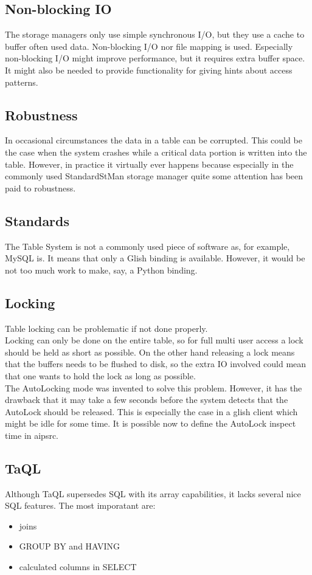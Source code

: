 \subsection{Non-blocking IO}
The storage managers only use simple synchronous I/O, but they use a
cache to buffer often used data.
Non-blocking I/O nor file mapping is used. Especially non-blocking I/O
might improve performance, but it requires extra buffer space.
It might also be needed to provide functionality for giving hints
about access patterns.

\subsection{Robustness}
In occasional circumstances the data in a table can be corrupted.
This could be the case when the system crashes while a critical data
portion is written into the table. However, in practice it
virtually ever happens because especially in the commonly used
StandardStMan storage manager quite some attention has been paid to
robustness.

\subsection{Standards}
The Table System is not a commonly used piece of software as, for
example, MySQL is. It means that only a Glish binding is available.
However, it would be not too much work to make, say, a Python binding.

\subsection{Locking}
Table locking can be problematic if not done properly.
\\Locking can only be done on the entire table, so for full multi user
access a lock should be held as short as possible. On the other hand
releasing a lock means that the buffers needs to be flushed to disk,
so the extra IO involved could mean that one wants to hold the lock
as long as possible.
\\The AutoLocking mode was invented to solve this problem. However,
it has the drawback that it may take a few seconds before the system
detects that the AutoLock should be released. This is especially the
case in a glish client which might be idle for some time. It is
possible now to define the AutoLock inspect time in aipsrc.

\subsection{TaQL}
Although TaQL supersedes SQL with its array capabilities, it lacks
several nice SQL features. The most imporatant are:
\begin{itemize}
\item joins
\item GROUP BY and HAVING
\item calculated columns in SELECT
\end{itemize}


